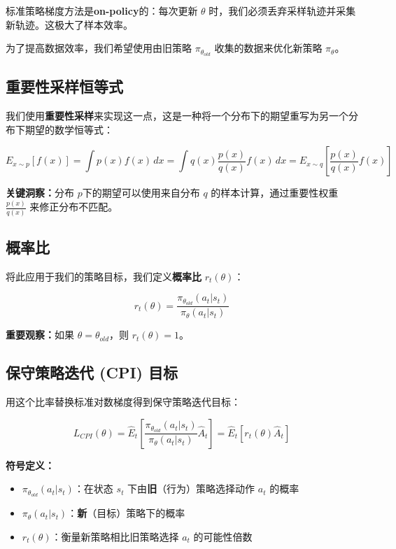 \documentclass[12pt,a4paper]{article}
\theoremstyle{noteplain}
\theoremstyle{noteexercise}
\begin{document}
标准策略梯度方法是\textbf{on-policy}的：每次更新 $\theta$ 时，我们必须丢弃采样轨迹并采集新轨迹。这极大了样本效率。

为了提高数据效率，我们希望使用由旧策略 $\pi_{\theta_{old}}$ 收集的数据来优化新策略 $\pi_\theta$。

\subsection{重要性采样恒等式}

我们使用\textbf{重要性采样}来实现这一点，这是一种将一个分布下的期望重写为另一个分布下期望的数学恒等式：

\begin{equation}\label{eq:is-identity}
  E_{x \sim p}[f(x)] = \int p(x) f(x) \, dx = \int q(x) \frac{p(x)}{q(x)} f(x) \, dx = E_{x \sim q}\left[\frac{p(x)}{q(x)} f(x)\right]
\end{equation}

\textbf{关键洞察：}分布 $p$下的期望可以使用来自分布 $q$ 的样本计算，通过重要性权重 $\frac{p(x)}{q(x)}$ 来修正分布不匹配。

\subsection{概率比}

将此应用于我们的策略目标，我们定义\textbf{概率比} $r_t(\theta)$：

\begin{equation}\label{eq:prob-ratio}
  r_t(\theta) = \frac{\pi_{\theta_{old}}(a_t|s_t)}{\pi_\theta(a_t|s_t)}
\end{equation}

\textbf{重要观察：}如果 $\theta = \theta_{old}$，则 $r_t(\theta) = 1$。

\subsection{保守策略迭代 (CPI) 目标}

用这个比率替换标准对数梯度得到保守策略迭代目标：

\begin{equation}\label{eq:l-cpi}
  L_{CPI}(\theta) = \hat{E}_t\left[\frac{\pi_{\theta_{old}}(a_t|s_t)}{\pi_\theta(a_t|s_t)} \hat{A}_t\right] = \hat{E}_t\left[r_t(\theta) \hat{A}_t\right]
\end{equation}

\textbf{符号定义：}
\begin{itemize}
  \setlength{\itemsep}{0.2em}
  \item $\pi_{\theta_{old}}(a_t|s_t)$：在状态 $s_t$ 下由\textbf{旧}（行为）策略选择动作 $a_t$ 的概率
  \item $\pi_\theta(a_t|s_t)$：\textbf{新}（目标）策略下的概率
  \item $r_t(\theta)$：衡量新策略相比旧策略选择 $a_t$ 的可能性倍数
\end{itemize}
\end{document}
